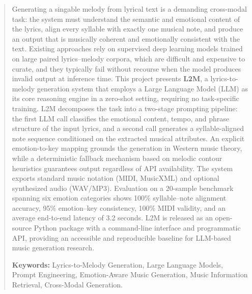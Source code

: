 \begin{abstract}
\thispagestyle{plain}
\setcounter{page}{1}

Generating a singable melody from lyrical text is a demanding cross-modal task: the system must understand the semantic and emotional content of the lyrics, align every syllable with exactly one musical note, and produce an output that is musically coherent and emotionally consistent with the text. Existing approaches rely on supervised deep learning models trained on large paired lyrics--melody corpora, which are difficult and expensive to curate, and they typically fail without recourse when the model produces invalid output at inference time. This project presents \textbf{L2M}, a lyrics-to-melody generation system that employs a Large Language Model (LLM) as its core reasoning engine in a zero-shot setting, requiring no task-specific training. L2M decomposes the task into a two-stage prompting pipeline: the first LLM call classifies the emotional content, tempo, and phrase structure of the input lyrics, and a second call generates a syllable-aligned note sequence conditioned on the extracted musical attributes. An explicit emotion-to-key mapping grounds the generation in Western music theory, while a deterministic fallback mechanism based on melodic contour heuristics guarantees output regardless of API availability. The system exports standard music notation (MIDI, MusicXML) and optional synthesized audio (WAV/MP3). Evaluation on a 20-sample benchmark spanning six emotion categories shows 100\% syllable--note alignment accuracy, 95\% emotion--key consistency, 100\% MIDI validity, and an average end-to-end latency of 3.2 seconds. L2M is released as an open-source Python package with a command-line interface and programmatic API, providing an accessible and reproducible baseline for LLM-based music generation research.

    \footnotesize
    \vspace{1cm}
    \noindent
    \textbf{Keywords:} Lyrics-to-Melody Generation, Large Language Models, Prompt Engineering, Emotion-Aware Music Generation, Music Information Retrieval, Cross-Modal Generation.

\end{abstract}
